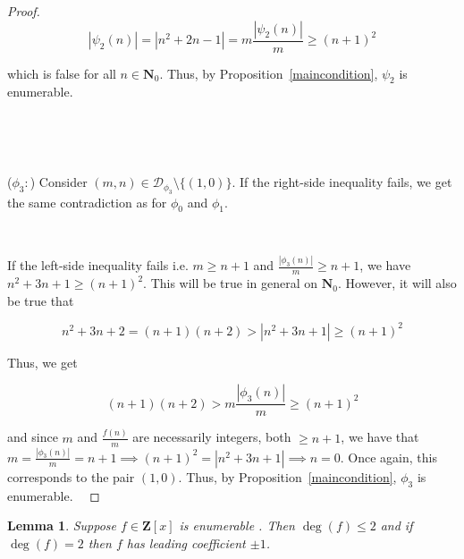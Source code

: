 \documentclass{article}
\newtheorem{lemma}[theorem]{Lemma}  %
\begin{document}
\begin{proof}
$$|\psi_2(n)| = |n^2 + 2n - 1| = m\frac{|\psi_2(n)|}{m} \geq (n+1)^2$$

which is false for all $n \in \mathbf{N}_0$. Thus, by Proposition~\ref{maincondition}, $\psi_2$ is enumerable.

\

\


($\phi_3:$) Consider $(m, n) \in \mathcal{D}_{\phi_3} \setminus \{(1,0)\}$. If the right-side inequality fails, we get the same contradiction as for $\phi_0$ and $\phi_1$.

\

If the left-side inequality fails i.e. $m \geq n + 1$ and $\frac{|\phi_3(n)|}{m} \geq n+1$, we have $n^2 + 3n + 1 \geq (n+1)^2$. This will be true in general on $\mathbf{N}_0$. However, it will also be true that

$$n^2 + 3n + 2 = (n+1)(n+2) > |n^2 + 3n + 1| \geq (n+1)^2$$

Thus, we get

$$(n+1)(n+2) > m  \frac{|\phi_3(n)|}{m} \geq (n+1)^2$$

and since $m$ and $\frac{f(n)}{m}$ are necessarily integers, both $\geq n+1$, we have that $m = \frac{|\phi_3(n)|}{m} = n+1 \implies (n+1)^2 = |n^2 + 3n + 1| \implies n = 0$. Once again, this corresponds to the pair $(1,0)$. Thus, by Proposition~\ref{maincondition}, $\phi_3$ is enumerable.
\
\end{proof}


\begin{lemma}\label{carlslemma}
Suppose $f \in \mathbf{Z}[x]$ is enumerable . Then $\deg(f) \leq 2$ and if $\deg(f) = 2$ then $f$ has leading coefficient $\pm 1$.
\end{lemma}
\end{document}
